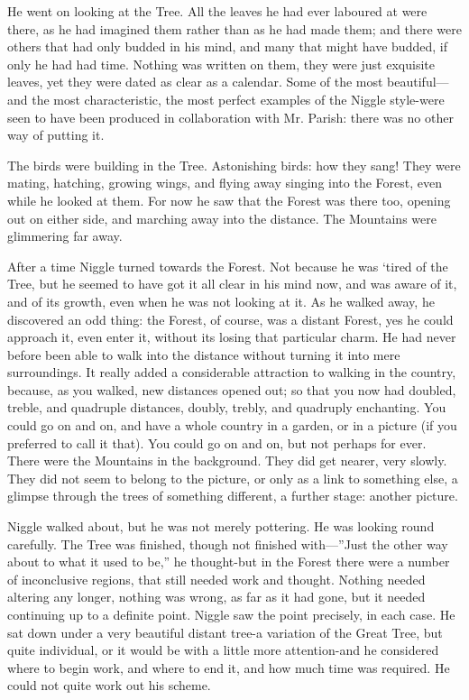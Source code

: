 \documentclass[english]{scrartcl}
\begin{document}
He went on looking at the Tree. All the leaves he had ever laboured at were there, as he had imagined them rather than as he had made them; and there were others that had only budded in his mind, and many that might have budded, if only he had had time. Nothing was written on them, they were just exquisite leaves, yet they were dated as clear as a calendar. Some of the most beautiful—and the most characteristic, the most perfect examples of the Niggle style-were seen to have been produced in collaboration with Mr. Parish: there was no other way of putting it.

The birds were building in the Tree. Astonishing birds: how they sang! They were mating, hatching, growing wings, and flying away singing into the Forest, even while he looked at them. For now he saw that the Forest was there too, opening out on either side, and marching away into the distance. The Mountains were glimmering far away.

After a time Niggle turned towards the Forest. Not because he was ‘tired of the Tree, but he seemed to have got it all clear in his mind now, and was aware of it, and of its growth, even when he was not looking at it. As he walked away, he discovered an odd thing: the Forest, of course, was a distant Forest, yes he could approach it, even enter it, without its losing that particular charm. He had never before been able to walk into the distance without turning it into mere surroundings. It really added a considerable attraction to walking in the country, because, as you walked, new distances opened out; so that you now had doubled, treble, and quadruple distances, doubly, trebly, and quadruply enchanting. You could go on and on, and have a whole country in a garden, or in a picture (if you preferred to call it that). You could go on and on, but not perhaps for ever. There were the Mountains in the background. They did get nearer, very slowly. They did not seem to belong to the picture, or only as a link to something else, a glimpse through the trees of something different, a further stage: another picture.

Niggle walked about, but he was not merely pottering. He was looking round carefully. The Tree was finished, though not finished with—”Just the other way about to what it used to be,” he thought-but in the Forest there were a number of inconclusive regions, that still needed work and thought. Nothing needed altering any longer, nothing was wrong, as far as it had gone, but it needed continuing up to a definite point. Niggle saw the point precisely, in each case. He sat down under a very beautiful distant tree-a variation of the Great Tree, but quite individual, or it would be with a little more attention-and he considered where to begin work, and where to end it, and how much time was required. He could not quite work out his scheme.
\end{document}

